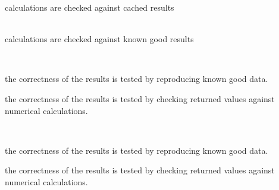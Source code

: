 \begin{DoxyRefList}
\label{test__test000135}%
%
calculations are checked against cached results  
\item[Class \doxylink{class_quant_lib_1_1_tree_vanilla_swap_engine}{Quant\+Lib\+::Tree\+Vanilla\+Swap\+Engine} ]\hfill \\
\label{test__test000134}%
%
calculations are checked against known good results  
\item[Member \doxylink{namespace_quant_lib_a573628be8b94717868e2c6a1058cd4d3}{Quant\+Lib\+::triangular\+Angles\+Parametrization} (const \doxylink{class_quant_lib_1_1_array}{Array} \&angles, \doxylink{namespace_quant_lib_af4cc4ef40b52c17cc455ead2a97aedb3}{Size} matrix\+Size, \doxylink{namespace_quant_lib_af4cc4ef40b52c17cc455ead2a97aedb3}{Size} rank)]\hfill \\
\label{test__test000054}%
%

\begin{DoxyItemize}
\item the correctness of the results is tested by reproducing known good data.
\item the correctness of the results is tested by checking returned values against numerical calculations. 
\end{DoxyItemize}
\item[Member \doxylink{namespace_quant_lib_af62ddda3dd7e71796de3b731df769228}{Quant\+Lib\+::triangular\+Angles\+Parametrization\+Rank\+Three} (\doxylink{namespace_quant_lib_a372ac5c1a422a6b276fe0552d4d83f50}{Real} alpha, \doxylink{namespace_quant_lib_a372ac5c1a422a6b276fe0552d4d83f50}{Real} t0, \doxylink{namespace_quant_lib_a372ac5c1a422a6b276fe0552d4d83f50}{Real} epsilon, \doxylink{namespace_quant_lib_af4cc4ef40b52c17cc455ead2a97aedb3}{Size} nb\+Rows)]\hfill \\
\label{test__test000055}%
%

\begin{DoxyItemize}
\item the correctness of the results is tested by reproducing known good data.
\item the correctness of the results is tested by checking returned values against numerical calculations. 
\end{DoxyItemize}
\item[Class \doxylink{class_quant_lib_1_1_turnbull_wakeman_asian_engine}{Quant\+Lib\+::Turnbull\+Wakeman\+Asian\+Engine} ]\hfill \\
\label{test__test000100}%
%


\end{DoxyRefList}

